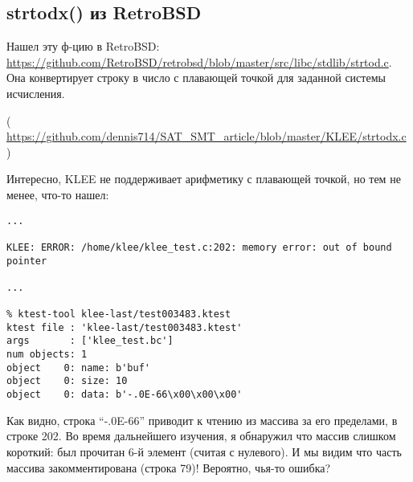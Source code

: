 \subsection{strtodx() из RetroBSD}

Нашел эту ф-цию в RetroBSD:
\url{https://github.com/RetroBSD/retrobsd/blob/master/src/libc/stdlib/strtod.c}.
Она конвертирует строку в число с плавающей точкой для заданной системы исчисления.


( \url{https://github.com/dennis714/SAT_SMT_article/blob/master/KLEE/strtodx.c} )

Интересно, KLEE не поддерживает арифметику с плавающей точкой, но тем не менее, что-то нашел:

\begin{lstlisting}
...

KLEE: ERROR: /home/klee/klee_test.c:202: memory error: out of bound pointer

...

% ktest-tool klee-last/test003483.ktest
ktest file : 'klee-last/test003483.ktest'
args       : ['klee_test.bc']
num objects: 1
object    0: name: b'buf'
object    0: size: 10
object    0: data: b'-.0E-66\x00\x00\x00'
\end{lstlisting}

Как видно, строка ``-.0E-66'' приводит к чтению из массива за его пределами, в строке 202.
Во время дальнейшего изучения, я обнаружил что массив  слишком короткий:
был прочитан 6-й элемент (считая с нулевого).
И мы видим что часть массива закомментирована (строка 79)!
Вероятно, чья-то ошибка?

